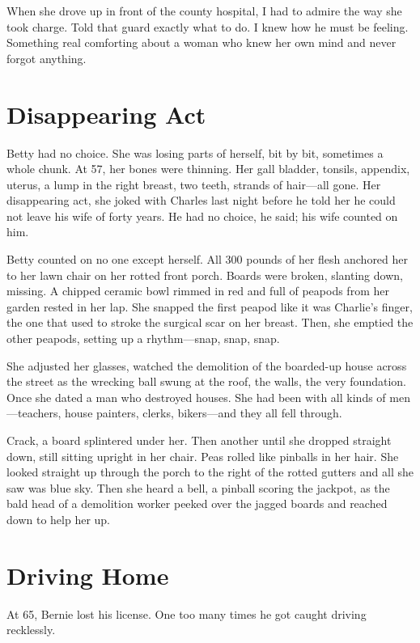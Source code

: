 \documentclass[twoside,10pt]{book}
\begin{document}
When she drove up in front of the county hospital, I had to admire the
way she took charge. Told that guard exactly what to do. I knew how he
must be feeling. Something real comforting about a woman who knew her
own mind and never forgot anything.



\cleardoublepage
\chapter{Disappearing Act}

Betty had no choice. She was losing parts of herself, bit by bit,
sometimes a whole chunk. At 57, her bones were thinning. Her gall
bladder, tonsils, appendix, uterus, a lump in the right breast, two
teeth, strands of hair---all gone. Her disappearing act, she joked with
Charles last night before he told her he could not leave his wife of
forty years. He had no choice, he said; his wife counted on him.

Betty counted on no one except herself. All 300 pounds of her flesh
anchored her to her lawn chair on her rotted front porch. Boards were
broken, slanting down, missing. A chipped ceramic bowl rimmed in red and
full of peapods from her garden rested in her lap. She snapped the first
peapod like it was Charlie's finger, the one that used to stroke the
surgical scar on her breast. Then, she emptied the other peapods,
setting up a rhythm---snap, snap, snap.

She adjusted her glasses, watched the demolition of the boarded-up house
across the street as the wrecking ball swung at the roof, the walls, the
very foundation. Once she dated a man who destroyed houses. She had been
with all kinds of men---teachers, house painters, clerks, bikers---and
they all fell through.

Crack, a board splintered under her. Then another until she dropped
straight down, still sitting upright in her chair. Peas rolled like
pinballs in her hair. She looked straight up through the porch to the
right of the rotted gutters and all she saw was blue sky. Then she heard
a bell, a pinball scoring the jackpot, as the bald head of a demolition
worker peeked over the jagged boards and reached down to help her
up.


\cleardoublepage
\chapter{Driving Home}

At 65, Bernie lost his license. One too many times he got caught driving
recklessly.
\end{document}
